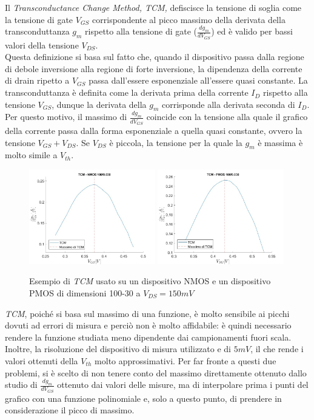 \documentclass[12pt, letterpaper]{book}
\begin{document}
Il \emph{Transconductance Change Method, TCM,} defiscisce la tensione di soglia come la tensione di gate $V_{GS}$ corrispondente al picco massimo della derivata della transconduttanza $g_m$ rispetto alla tensione di gate ($\frac{dg_m}{dV_ {GS}}$) ed è valido per bassi valori della tensione $V_{DS}$.\\
Questa definizione si basa sul fatto che, quando il dispositivo passa dalla regione di debole inversione alla regione di forte inversione, la dipendenza della corrente di drain ripetto a $V_{GS}$ passa dall'essere esponenziale all'essere quasi constante.
La transconduttanza è definita come la derivata prima della corrente $I_D$ rispetto alla tensione $V_{GS}$, dunque la derivata della $g_m$ corrisponde alla derivata seconda di $I_D$. Per questo motivo, il massimo di $\frac{dg_m}{dV_{GS}}$ coincide con la tensione alla quale il grafico della corrente passa dalla forma esponenziale a quella quasi constante, ovvero la tensione $V_{GS}+V_{DS}$. Se $V_{DS}$ è piccola, la tensione per la quale la $g_m$ è massima è molto simile a $V_{th}$.\\

\begin{figure}[h!]
  \centering
  \includegraphics[width=0.49\textwidth]{TCM-N4-100-30-NoFit}
  \includegraphics[width=0.49\textwidth]{TCM-P1-100-30-NoFit}
  \caption{Esempio di \emph{TCM} usato su un dispositivo NMOS e un dispositivo PMOS di dimensioni 100-30 a $V_{DS} = 150 mV$}
\end{figure}

\emph{TCM}, poiché si basa sul massimo di una funzione, è molto sensibile ai picchi dovuti ad errori di misura e perciò non è molto affidabile: è quindi necessario rendere la funzione studiata meno dipendente dai campionamenti fuori scala. Inoltre, la risoluzione del dispositivo di misura utilizzato e di $5 mV$, il che rende i valori ottenuti della $V_{th}$ molto approssimativi.
Per far fronte a questi due problemi, si è scelto di non tenere conto del massimo direttamente ottenuto dallo studio di $\frac{dg_m}{dV_{GS}}$ ottenuto dai valori delle misure, ma di interpolare prima i punti del grafico con una funzione polinomiale e, solo a questo punto, di prendere in considerazione il picco di massimo. \\
\end{document}
